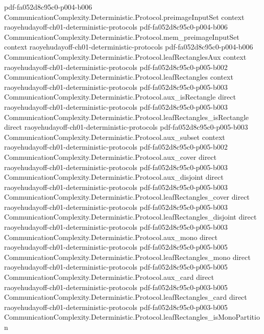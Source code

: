 \begin{theorem}
  {pdf-fa052d8c95c0-p004-b006}
\proofstep
  {CommunicationComplexity.Deterministic.Protocol.preimageInputSet}
  {context}
  {raoyehudayoff-ch01-deterministic-protocols}
  {pdf-fa052d8c95c0-p004-b006}
\proofstep
  {CommunicationComplexity.Deterministic.Protocol.mem_preimageInputSet}
  {context}
  {raoyehudayoff-ch01-deterministic-protocols}
  {pdf-fa052d8c95c0-p004-b006}
\proofstep
  {CommunicationComplexity.Deterministic.Protocol.leafRectanglesAux}
  {context}
  {raoyehudayoff-ch01-deterministic-protocols}
  {pdf-fa052d8c95c0-p005-b002}
\proofstep
  {CommunicationComplexity.Deterministic.Protocol.leafRectangles}
  {context}
  {raoyehudayoff-ch01-deterministic-protocols}
  {pdf-fa052d8c95c0-p005-b003}
\proofstep
  {CommunicationComplexity.Deterministic.Protocol.aux_isRectangle}
  {direct}
  {raoyehudayoff-ch01-deterministic-protocols}
  {pdf-fa052d8c95c0-p005-b003}
\proofstep
  {CommunicationComplexity.Deterministic.Protocol.leafRectangles_isRectangle}
  {direct}
  {raoyehudayoff-ch01-deterministic-protocols}
  {pdf-fa052d8c95c0-p005-b003}
\proofstep
  {CommunicationComplexity.Deterministic.Protocol.aux_subset}
  {context}
  {raoyehudayoff-ch01-deterministic-protocols}
  {pdf-fa052d8c95c0-p005-b002}
\proofstep
  {CommunicationComplexity.Deterministic.Protocol.aux_cover}
  {direct}
  {raoyehudayoff-ch01-deterministic-protocols}
  {pdf-fa052d8c95c0-p005-b003}
\proofstep
  {CommunicationComplexity.Deterministic.Protocol.aux_disjoint}
  {direct}
  {raoyehudayoff-ch01-deterministic-protocols}
  {pdf-fa052d8c95c0-p005-b003}
\proofstep
  {CommunicationComplexity.Deterministic.Protocol.leafRectangles_cover}
  {direct}
  {raoyehudayoff-ch01-deterministic-protocols}
  {pdf-fa052d8c95c0-p005-b003}
\proofstep
  {CommunicationComplexity.Deterministic.Protocol.leafRectangles_disjoint}
  {direct}
  {raoyehudayoff-ch01-deterministic-protocols}
  {pdf-fa052d8c95c0-p005-b003}
\proofstep
  {CommunicationComplexity.Deterministic.Protocol.aux_mono}
  {direct}
  {raoyehudayoff-ch01-deterministic-protocols}
  {pdf-fa052d8c95c0-p005-b005}
\proofstep
  {CommunicationComplexity.Deterministic.Protocol.leafRectangles_mono}
  {direct}
  {raoyehudayoff-ch01-deterministic-protocols}
  {pdf-fa052d8c95c0-p005-b005}
\proofstep
  {CommunicationComplexity.Deterministic.Protocol.aux_card}
  {direct}
  {raoyehudayoff-ch01-deterministic-protocols}
  {pdf-fa052d8c95c0-p003-b005}
\proofstep
  {CommunicationComplexity.Deterministic.Protocol.leafRectangles_card}
  {direct}
  {raoyehudayoff-ch01-deterministic-protocols}
  {pdf-fa052d8c95c0-p003-b005}
\proofstep
  {CommunicationComplexity.Deterministic.Protocol.leafRectangles_isMonoPartition}

\end{theorem}
